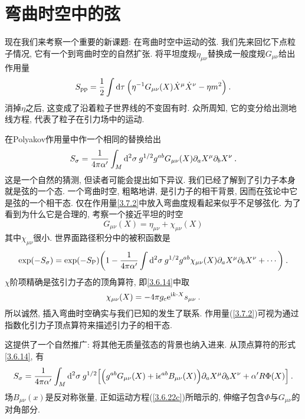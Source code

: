 \section{\texorpdfstring{弯曲时空中的弦}{3.7 Strings in curved spacetime}} \label{sec:3.7}


现在我们来考察一个重要的新课题: 在弯曲时空中运动的弦. 我们先来回忆下点粒子情况, 它有一个到弯曲时空的自然扩张. 将平坦度规$\eta_{\mu\nu}$替换成一般度规$G_{\mu\nu}$给出作用量
\begin{equation}
S_{\mathrm{pp}}=\frac{1}{2} \int \mathrm{d} \tau\: \Bigl(\eta^{-1} G_{\mu \nu}(X) \dot{X}^{\mu} \dot{X}^{\nu}-\eta m^{2}\Bigr) \:. \label{3.7.1}
\end{equation}
消掉$\eta$之后, 这变成了沿着粒子世界线的不变固有时. 众所周知, 它的变分给出测地线方程, 代表了粒子在引力场中的运动. 

在Polyakov作用量中作一个相同的替换给出
\begin{equation}
S_{\sigma}=\frac{1}{4 \pi \alpha^{\prime}} \int_{M} \mathrm{d}^{2} \sigma \:g^{1 / 2} g^{a b} G_{\mu \nu}(X) \partial_{a} X^{\mu} \partial_{b} X^{\nu} \:. \label{3.7.2}
\end{equation}
这是一个自然的猜测, 但读者可能会提出如下异议. 我们已经了解到了引力子本身就是弦的一个态. 一个弯曲时空, 粗略地讲, 是引力子的相干背景, 因而在弦论中它是弦的一个相干态. 仅在作用量\eqref{3.7.2}中放入弯曲度规看起来似乎不足够弦化. 为了看到为什么它是合理的, 考察一个接近平坦的时空
\begin{equation}
G_{\mu \nu}(X)=\eta_{\mu \nu}+\chi_{\mu \nu}(X) \label{3.7.3}
\end{equation}
其中$\chi_{\mu\nu}$很小. 世界面路径积分中的被积函数是                                        
\begin{equation}
\exp(-S_{\sigma})=\exp(-S_{\mathrm{P}})\biggl(1-\frac{1}{4\pi\alpha'}\int \mathrm{d}^{2}\sigma\:g^{1/2}g^{ab}\chi_{\mu\nu}(X)\partial_{a}X^{\mu}\partial_{b}X^{\nu}+\cdots \biggr) \:. \label{3.7.4}
\end{equation}
$\chi$阶项精确是弦引力子态的顶角算符, 即\eqref{3.6.14}中取
\begin{equation}
\chi_{\mu \nu}(X)=-4 \pi g_{\mathrm{c}} \mathrm{e}^{\mathrm{i} k \cdot X} s_{\mu \nu}\:. \label{3.7.5}
\end{equation}
所以诚然, 插入弯曲时空确实与我们已知的发生了联系. 作用量(\ref{3.7.2})可视为通过指数化引力子顶点算符来描述引力子的相干态.

这提供了一个自然推广: 将其他无质量弦态的背景也纳入进来. 从顶点算符的形式\eqref{3.6.14}, 有
\begin{equation}\label{3.7.6}
S_{\sigma}=\frac{1}{4 \pi \alpha^{\prime}} \int_{M} \mathrm{d}^{2} \sigma \: g^{1 / 2}\Bigl[\Bigl(g^{a b} G_{\mu \nu}(X)+ \mathrm{i} \epsilon^{a b} B_{\mu \nu}(X)\Bigr) \partial_{a} X^{\mu} \partial_{b} X^{\nu}+\alpha^{\prime} R \Phi(X)\Bigr] \:.
\end{equation}
场$B_{\mu\nu}(x)$是反对称张量, 正如运动方程(\ref{3.6.22c})所暗示的, 伸缩子包含$\Phi$与$G_{\mu\nu}$的对角部分. 


